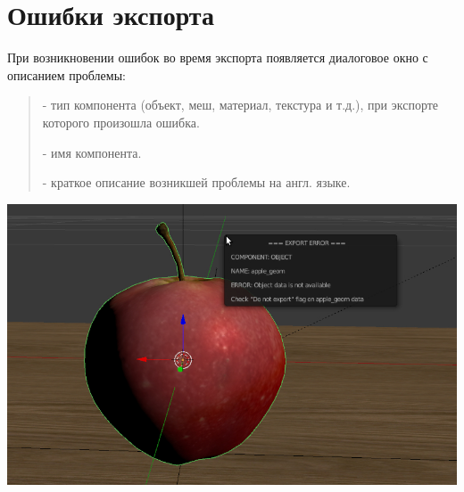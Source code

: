 \documentclass[a4paper,12pt,oneside]{sphinxmanual}
\begin{document}

\chapter{Ошибки экспорта}
\label{export_errors:index-0}\label{export_errors:export-errors}\label{export_errors::doc}\label{export_errors:id1}
При возникновении ошибок во время экспорта появляется диалоговое окно  с описанием проблемы:
\begin{quote}

 - тип компонента (объект, меш, материал, текстура и т.д.), при экспорте которого произошла ошибка.

 - имя компонента.

 - краткое описание возникшей проблемы на англ. языке.
\end{quote}

{\hfill\includegraphics[width=1.000\linewidth]{error_message.jpg}\hfill}

\begin{DUlineblock}{0em}
\item[] 
\end{DUlineblock}
\end{document}
